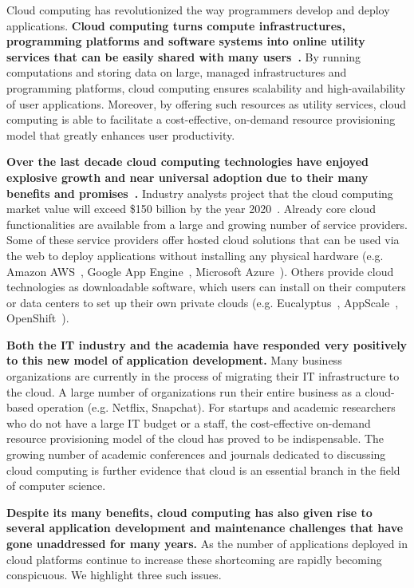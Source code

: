Cloud computing has revolutionized the way programmers develop and deploy applications.
\textbf{Cloud computing turns compute infrastructures, programming platforms and software systems
into online utility services that can be easily shared with many users~\cite{hassan2011demystifying,Mell:2011:SND:2206223}.}
By running computations and storing data on large, managed infrastructures and 
programming platforms, cloud computing ensures scalability and high-availability of 
user applications. Moreover, by offering such resources
as utility services, cloud computing is able to facilitate a cost-effective, on-demand
resource provisioning model that greatly enhances user productivity.

\textbf{Over the last decade cloud computing technologies have enjoyed explosive growth 
and near universal adoption due to their many benefits and 
promises~\cite{Antonopoulos:2010:CCP:1855007,Pinheiro:2014:ACC:2618168.2618188}.} 
Industry analysts project that the cloud computing market value will exceed \$150 billion
by the year 2020~\cite{cloud-growth}.
Already core cloud 
functionalities are available from a large and growing number of service providers. 
Some of these service providers offer hosted cloud solutions that can be used
via the web to deploy applications without installing any physical hardware 
(e.g. Amazon AWS~\cite{amazon-aws-web}, Google App Engine~\cite{gae}, Microsoft Azure~\cite{azure-web}). Others
provide cloud technologies as downloadable software, which users can install
on their computers or data centers to set up their own private clouds 
(e.g. Eucalyptus~\cite{eucalyptus09}, AppScale~\cite{6488671}, OpenShift~\cite{openshift}). 

\textbf{Both the IT industry and the academia have responded very positively to this new 
model of application 
development.} Many business organizations are currently in the process of migrating
their IT infrastructure to the cloud. A large number of organizations
run their entire business as a cloud-based operation (e.g. Netflix, Snapchat). For startups
and academic researchers who do not have a large IT budget or a staff, the cost-effective 
on-demand resource provisioning model of the cloud has proved to be indispensable.
The growing number of academic conferences and journals dedicated to discussing
cloud computing is further evidence that cloud is an essential branch in the field
of computer science.

\textbf{Despite its many benefits, cloud computing has also given rise to several application
development and maintenance challenges that have gone unaddressed for many years.}
As the number of applications deployed in cloud platforms continue to increase these
shortcoming are rapidly becoming conspicuous. We highlight three such issues.
 
